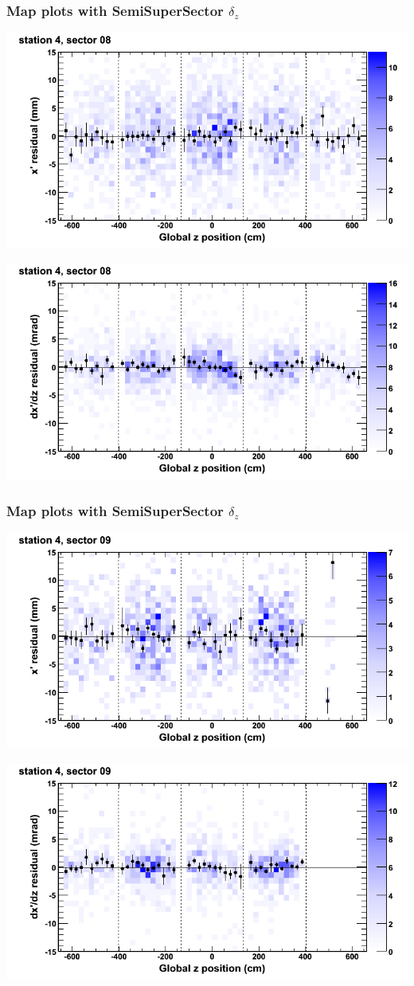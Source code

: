 \documentclass[compress]{beamer}
\begin{document}
\begin{frame}
\frametitle{Map plots with SemiSuperSector $\delta_z$}
\includegraphics[width=0.5\linewidth]{zfit_mapplots/DTvsz_st4sec08_x.png}

\includegraphics[width=0.5\linewidth]{zfit_mapplots/DTvsz_st4sec08_dxdz.png}
\end{frame}

\begin{frame}
\frametitle{Map plots with SemiSuperSector $\delta_z$}
\includegraphics[width=0.5\linewidth]{zfit_mapplots/DTvsz_st4sec09_x.png}

\includegraphics[width=0.5\linewidth]{zfit_mapplots/DTvsz_st4sec09_dxdz.png}
\end{frame}
\end{document}
